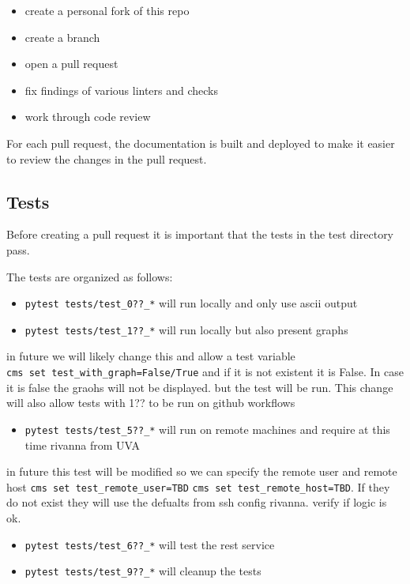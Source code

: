\begin{itemize}
\tightlist
\item
  create a personal fork of this repo
\item
  create a branch
\item
  open a pull request
\item
  fix findings of various linters and checks
\item
  work through code review
\end{itemize}

For each pull request, the documentation is built and deployed to make
it easier to review the changes in the pull request.

\hypertarget{tests}{%
\subsection{Tests}\label{tests}}

Before creating a pull request it is important that the tests in the
test directory pass.

The tests are organized as follows:

\begin{itemize}
\tightlist
\item
  \texttt{pytest\ tests/test\_0??\_*} will run locally and only use
  ascii output
\item
  \texttt{pytest\ tests/test\_1??\_*} will run locally but also present
  graphs
\end{itemize}

in future we will likely change this and allow a test variable
\texttt{cms\ set\ test\_with\_graph=False/True} and if it is not
existent it is False. In case it is false the graohs will not be
displayed. but the test will be run. This change will also allow tests
with 1?? to be run on github workflows

\begin{itemize}
\tightlist
\item
  \texttt{pytest\ tests/test\_5??\_*} will run on remote machines and
  require at this time rivanna from UVA
\end{itemize}

in future this test will be modified so we can specify the remote user
and remote host \texttt{cms\ set\ test\_remote\_user=TBD}
\texttt{cms\ set\ test\_remote\_host=TBD}. If they do not exist they
will use the defualts from ssh config rivanna. verify if logic is ok.

\begin{itemize}
\tightlist
\item
  \texttt{pytest\ tests/test\_6??\_*} will test the rest service
\item
  \texttt{pytest\ tests/test\_9??\_*} will cleanup the tests
\end{itemize}
